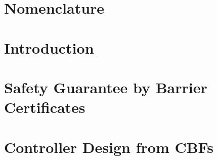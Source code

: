 
\graphicspath{{figures/}}


	






\setcounter{page}{1}
\renewcommand{\thepage}{\Roman{page}}




\setlength\parskip{0ex}
\tableofcontents
\setlength\parskip{1ex}

\chapter*{Nomenclature}\label{chap:acronym}
\printglossary[style=mcoltree,title=Glossary] %
\printglossary[type=\acronymtype,style=glossary2col] %
\printglossary[type=symbols,style=altlong4col] %
\clearpage



\cleardoublepage
\setcounter{page}{1}
\renewcommand{\thepage}{\arabic{page}}

\chapter{Introduction}\label{chap:intro}



\chapter{Safety Guarantee by Barrier Certificates}\label{chap:barrier_cerificates}
	

\chapter{Controller Design from CBFs}\label{chap:cbf}
	
